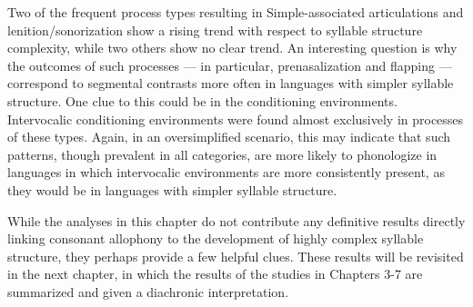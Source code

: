   Two of the frequent process types resulting in Simple-associated articulations and lenition/sonorization show a rising trend with respect to syllable structure complexity, while two others show no clear trend. An interesting question is why the outcomes of such processes — in particular, prenasalization and flapping — correspond to segmental contrasts more often in languages with simpler syllable structure. One clue to this could be in the conditioning environments. Intervocalic conditioning environments were found almost exclusively in processes of these types. Again, in an oversimplified scenario, this may indicate that such patterns, though prevalent in all categories, are more likely to phonologize in languages in which intervocalic environments are more consistently present, as they would be in languages with simpler syllable structure.

  While the analyses in this chapter do not contribute any definitive results directly linking consonant allophony to the development of highly complex syllable structure, they perhaps provide a few helpful clues. These results will be revisited in the next chapter, in which the results of the studies in Chapters 3-7 are summarized and given a diachronic interpretation.

